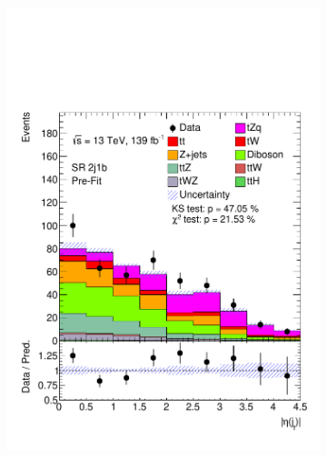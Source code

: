 \begin{figure}
    \begin{subfigure}[b]{0.32\linewidth}
    \centering
    \includegraphics[width=\linewidth]{ubonn-thesis/Chapters/Chapters_06/Figure/Input_distribution/SR_2j1b_forwardjet_eta.pdf} 
  \end{subfigure}%
  \begin{subfigure}[b]{0.32\linewidth}
    \centering

\end{subfigure}
\end{figure}
